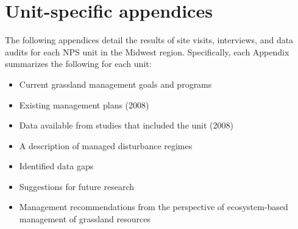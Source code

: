 \section*{Unit-specific appendices} \label{apps}

\begin{adjustwidth}{2cm}{2cm}



The following appendices detail the results of site visits, interviews, and data audits for each NPS unit in the Midwest region. Specifically, each Appendix summarizes the following for each unit: 

\begin{itemize}
	\item Current grassland management goals and programs
	\item Existing management plans (2008)
	\item Data available from studies that included the unit (2008)
	\item A description of managed disturbance regimes 
	\item Identified data gaps 
	\item Suggestions for future research 
	\item Management recommendations from the perspective of ecosystem-based management of grassland resources
\end{itemize}

\end{adjustwidth}